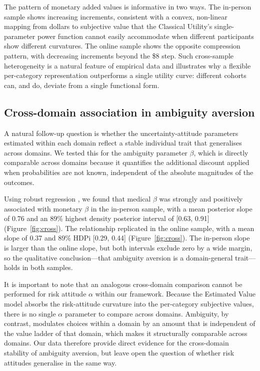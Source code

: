 \documentclass[11pt]{article}
\begin{document}
The pattern of monetary added values is informative in two ways. The in-person sample shows increasing increments, consistent with a convex, non-linear mapping from dollars to subjective value that the Classical Utility's single-parameter power function cannot easily accommodate when different participants show different curvatures. The online sample shows the opposite compression pattern, with decreasing increments beyond the \$8 step. Such cross-sample heterogeneity is a natural feature of empirical data and illustrates why a flexible per-category representation outperforms a single utility curve: different cohorts can, and do, deviate from a single functional form.

\subsection{Cross-domain association in ambiguity aversion}

A natural follow-up question is whether the uncertainty-attitude parameters estimated within each domain reflect a stable individual trait that generalises across domains. We tested this for the ambiguity parameter $\beta$, which is directly comparable across domains because it quantifies the additional discount applied when probabilities are not known, independent of the absolute magnitudes of the outcomes.

Using robust regression \citep{wu2016loss}, we found that medical $\beta$ was strongly and positively associated with monetary $\beta$ in the in-person sample, with a mean posterior slope of 0.76 and an 89\% highest density posterior interval of [0.63, 0.91] (Figure~\ref{fig:cross}). The relationship replicated in the online sample, with a mean slope of 0.37 and 89\% HDPi [0.29, 0.44] (Figure~\ref{fig:cross}). The in-person slope is larger than the online slope, but both intervals exclude zero by a wide margin, so the qualitative conclusion---that ambiguity aversion is a domain-general trait---holds in both samples.

It is important to note that an analogous cross-domain comparison cannot be performed for risk attitude $\alpha$ within our framework. Because the Estimated Value model absorbs the risk-attitude curvature into the per-category subjective values, there is no single $\alpha$ parameter to compare across domains. Ambiguity, by contrast, modulates choices within a domain by an amount that is independent of the value ladder of that domain, which makes it structurally comparable across domains. Our data therefore provide direct evidence for the cross-domain stability of ambiguity aversion, but leave open the question of whether risk attitudes generalise in the same way.
\end{document}
